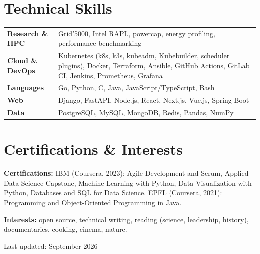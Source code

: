 \documentclass[10pt,a4paper]{article}
\begin{document}
\section{Technical Skills}
\begin{tabularx}{\linewidth}{@{}>{\bfseries}p{3.4cm}X@{}}
  Research \& HPC     & Grid'5000, Intel RAPL, powercap, energy profiling, performance benchmarking \\
  Cloud \& DevOps     & Kubernetes (k8s, k3s, kubeadm, Kubebuilder, scheduler plugins), Docker,
                        Terraform, Ansible, GitHub Actions, GitLab CI, Jenkins, Prometheus, Grafana \\
  Languages           & Go, Python, C, Java, JavaScript/TypeScript, Bash \\
  Web                 & Django, FastAPI, Node.js, React, Next.js, Vue.js, Spring Boot \\
  Data                & PostgreSQL, MySQL, MongoDB, Redis, Pandas, NumPy \\
\end{tabularx}

\section{Certifications \& Interests}
\textbf{Certifications:} IBM (Coursera, 2023): Agile Development and Scrum, Applied Data Science
Capstone, Machine Learning with Python, Data Visualization with Python, Databases and SQL for
Data Science. EPFL (Coursera, 2021): Programming and Object-Oriented Programming in Java.

\vspace{0.6ex}
\textbf{Interests:} open source, technical writing, reading (science, leadership, history),
documentaries, cooking, cinema, nature.

\vfill
{\centering\footnotesize\color{muted} Last updated: September 2026\par}
\end{document}
